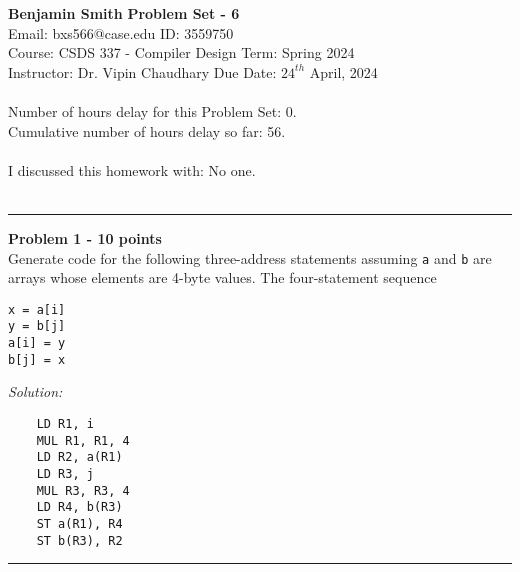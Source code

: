\documentclass[a4paper, 11pt]{article}
\newenvironment{problem}[2][Problem]
    { \begin{mdframed}[backgroundcolor=gray!20] \textbf{#1 #2} \\}
    {  \end{mdframed}}
\newenvironment{solution}
    {\textit{Solution:}}
    {}
\begin{document}
\noindent
\large\textbf{Benjamin Smith} \hfill \textbf{Problem Set - 6}   \\
Email: bxs566@case.edu \hfill ID: 3559750 \\
\normalsize Course: CSDS 337 - Compiler Design \hfill Term: Spring 2024\\
Instructor: Dr. Vipin Chaudhary \hfill Due Date: $24^{th}$ April, 2024 \\ \\
Number of hours delay for this Problem Set: \hfill 0.\\
Cumulative number of hours delay so far: \hfill 56. \\ \\
I discussed this homework with: \hfill No one. \\ \\

\noindent\rule{7in}{2.8pt}
\begin{problem}{1 - 10 points}
Generate code for the following three-address statements assuming \verb!a! and \verb!b! are arrays whose elements are 4-byte values. The four-statement sequence
\begin{verbatim}
x = a[i]  
y = b[j]  
a[i] = y  
b[j] = x  
\end{verbatim}

\end{problem}
\begin{solution}
    \begin{verbatim}
    LD R1, i
    MUL R1, R1, 4
    LD R2, a(R1)
    LD R3, j
    MUL R3, R3, 4
    LD R4, b(R3)
    ST a(R1), R4
    ST b(R3), R2
    \end{verbatim}
\end{solution}

\noindent\rule{7in}{2.8pt}

\end{document}
